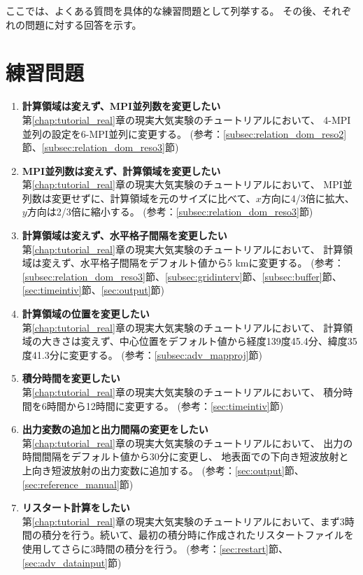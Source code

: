 ここでは、よくある質問を具体的な練習問題として列挙する。
その後、それぞれの問題に対する回答を示す。


\section*{練習問題}

\begin{enumerate}
\item {\bf 計算領域は変えず、MPI並列数を変更したい}\\
第\ref{chap:tutorial_real}章の現実大気実験のチュートリアルにおいて、
4-MPI並列の設定を6-MPI並列に変更する。
(参考：\ref{subsec:relation_dom_reso2}節、\ref{subsec:relation_dom_reso3}節)

\item {\bf MPI並列数は変えず、計算領域を変更したい}\\
第\ref{chap:tutorial_real}章の現実大気実験のチュートリアルにおいて、
MPI並列数は変更せずに、計算領域を元のサイズに比べて、$x$方向に4/3倍に拡大、$y$方向は2/3倍に縮小する。
(参考：\ref{subsec:relation_dom_reso3}節)

\item {\bf 計算領域は変えず、水平格子間隔を変更したい}\\
第\ref{chap:tutorial_real}章の現実大気実験のチュートリアルにおいて、
計算領域は変えず、水平格子間隔をデフォルト値から5 kmに変更する。
(参考：\ref{subsec:relation_dom_reso3}節、\ref{subsec:gridinterv}節、\ref{subsec:buffer}節、\ref{sec:timeintiv}節、\ref{sec:output}節)

\item {\bf 計算領域の位置を変更したい}\\
第\ref{chap:tutorial_real}章の現実大気実験のチュートリアルにおいて、
計算領域の大きさは変えず、中心位置をデフォルト値から経度139度45.4分、緯度35度41.3分に変更する。
(参考：\ref{subsec:adv_mapproj}節)

\item {\bf 積分時間を変更したい}\\
第\ref{chap:tutorial_real}章の現実大気実験のチュートリアルにおいて、
積分時間を6時間から12時間に変更する。
(参考：\ref{sec:timeintiv}節)

\item {\bf 出力変数の追加と出力間隔の変更をしたい}\\
第\ref{chap:tutorial_real}章の現実大気実験のチュートリアルにおいて、
出力の時間間隔をデフォルト値から30分に変更し、
地表面での下向き短波放射と上向き短波放射の出力変数に追加する。
(参考：\ref{sec:output}節、\ref{sec:reference_manual}節)

\item {\bf リスタート計算をしたい}\\
第\ref{chap:tutorial_real}章の現実大気実験のチュートリアルにおいて、まず3時間の積分を行う。続いて、最初の積分時に作成されたリスタートファイルを使用してさらに3時間の積分を行う。
(参考：\ref{sec:restart}節、\ref{sec:adv_datainput}節)


\end{enumerate}

